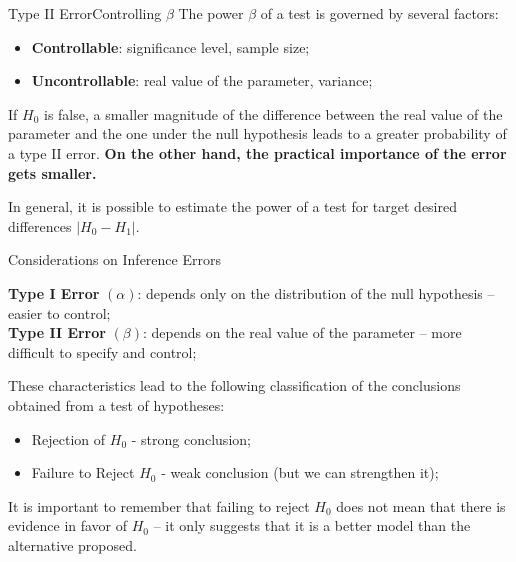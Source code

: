 \begin{frame}{Type II Error}{Controlling $\beta$}
  The power $\beta$ of a test is governed by several factors:
  \begin{itemize}
    \item {\bf Controllable}: significance level, sample size;
    \item {\bf Uncontrollable}: real value of the parameter, variance;
  \end{itemize}\bigskip

  If $H_0$ is false, a smaller magnitude of the difference between the real value of the parameter and the one under the null hypothesis leads to a greater probability of a type II error. {\bf On the other hand, the practical importance of the error gets smaller.}\vfill

  In general, it is possible to estimate the power of a test for target desired differences $|H_0 - H_1|$.
\end{frame}

\begin{frame}{Considerations on Inference Errors}

  {\bf Type I Error} $(\alpha)$: depends only on the distribution of the null hypothesis -- easier to control;\\
  {\bf Type II Error} $(\beta)$: depends on the real value of the parameter -- more difficult to specify and control;\\
  \bigskip

  These characteristics lead to the following classification of the conclusions obtained from a test of hypotheses:
  \begin{exampleblock}{}
    \begin{itemize}
      \item Rejection of $H_0$ - strong conclusion;
      \item Failure to Reject $H_0$ - weak conclusion (but we can strengthen it);
    \end{itemize}
  \end{exampleblock}
  It is important to remember that failing to reject $H_0$ does not mean that there is evidence in favor of $H_0$ -- it only suggests that it is a better model than the alternative proposed.
\end{frame}

